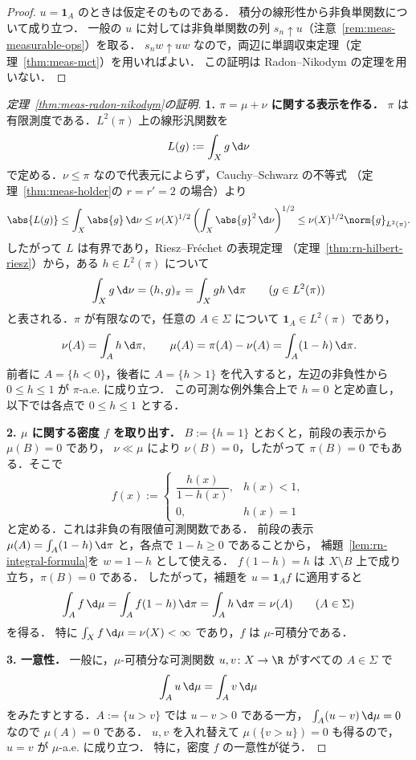 \begin{proof}
  $u=\mathbf{1}_A$ のときは仮定そのものである．
  積分の線形性から非負単関数について成り立つ．
  一般の $u$ に対しては非負単関数の列 $s_n\uparrow u$（注意~\ref{rem:meas-measurable-ops}）を取る．
  $s_nw\uparrow uw$ なので，両辺に単調収束定理（定理~\ref{thm:meas-mct}）を用いればよい．
  この証明は Radon--Nikodym の定理を用いない．
\end{proof}

\begin{proof}[定理~\ref{thm:meas-radon-nikodym}の証明]
  \textbf{1. $\pi=\mu+\nu$ に関する表示を作る．}
  $\pi$ は有限測度である．$L^2(\pi)$ 上の線形汎関数を
  \[
    L(g):=\int_Xg\,\d\nu
  \]
  で定める．$\nu\leq\pi$ なので代表元によらず，Cauchy--Schwarz の不等式
  （定理~\ref{thm:meas-holder}の $r=r'=2$ の場合）より
  \[
    \abs{L(g)}\leq\int_X\abs{g}\,\d\nu
    \leq\nu(X)^{1/2}\left(\int_X\abs{g}^2\,\d\nu\right)^{1/2}
    \leq\nu(X)^{1/2}\norm{g}_{L^2(\pi)}.
  \]
  したがって $L$ は有界であり，Riesz--Fréchet の表現定理
  （定理~\ref{thm:rn-hilbert-riesz}）から，ある $h\in L^2(\pi)$ について
  \[
    \int_Xg\,\d\nu=(h,g)_\pi=\int_Xgh\,\d\pi\qquad(g\in L^2(\pi))
  \]
  と表される．$\pi$ が有限なので，任意の $A\in\Sigma$ について $\mathbf{1}_A\in L^2(\pi)$ であり，
  \[
    \nu(A)=\int_Ah\,\d\pi,\qquad
    \mu(A)=\pi(A)-\nu(A)=\int_A(1-h)\,\d\pi.
  \]
  前者に $A=\{h<0\}$，後者に $A=\{h>1\}$ を代入すると，左辺の非負性から
  $0\leq h\leq1$ が $\pi$-a.e. に成り立つ．
  この可測な例外集合上で $h=0$ と定め直し，以下では各点で $0\leq h\leq1$ とする．

  \textbf{2. $\mu$ に関する密度 $f$ を取り出す．}
  $B:=\{h=1\}$ とおくと，前段の表示から $\mu(B)=0$ であり，
  $\nu\ll\mu$ により $\nu(B)=0$，したがって $\pi(B)=0$ でもある．そこで
  \[
    f(x):=\begin{cases}
      \dfrac{h(x)}{1-h(x)},&h(x)<1,\\
      0,&h(x)=1
    \end{cases}
  \]
  と定める．これは非負の有限値可測関数である．
  前段の表示 $\mu(A)=\int_A(1-h)\,\d\pi$ と，各点で $1-h\geq0$ であることから，
  補題~\ref{lem:rn-integral-formula}を $w=1-h$ として使える．
  $f(1-h)=h$ は $X\setminus B$ 上で成り立ち，$\pi(B)=0$ である．
  したがって，補題を $u=\mathbf{1}_A f$ に適用すると
  \[
    \int_Af\,\d\mu=\int_Af(1-h)\,\d\pi=\int_Ah\,\d\pi=\nu(A)
    \qquad(A\in\Sigma)
  \]
  を得る．
  特に $\int_Xf\,\d\mu=\nu(X)<\infty$ であり，$f$ は $\mu$-可積分である．

  \textbf{3. 一意性．}
  一般に，$\mu$-可積分な可測関数 $u,v\colon X\to\R$ がすべての $A\in\Sigma$ で
  \[
    \int_Au\,\d\mu=\int_Av\,\d\mu
  \]
  をみたすとする．$A:=\{u>v\}$ では $u-v>0$ である一方，
  $\int_A(u-v)\,\d\mu=0$ なので $\mu(A)=0$ である．
  $u,v$ を入れ替えて $\mu(\{v>u\})=0$ も得るので，$u=v$ が $\mu$-a.e. に成り立つ．
  特に，密度 $f$ の一意性が従う．
\end{proof}

